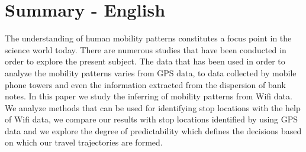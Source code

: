 \chapter{Summary - English}

The understanding of human mobility patterns constitutes a focus point in the
science world today. There are numerous studies that have been conducted in
order to explore the present subject. The data that has been used in order to
analyze the mobility patterns varies from GPS data, to data collected by mobile
phone towers and even the information extracted from the dispersion of bank
notes. In this paper we study the inferring of mobility patterns from Wifi data.
We analyze methods that can be used for identifying stop locations with the help
of Wifi data, we compare our results with stop locations identified by using GPS
data and we explore the degree of predictability which defines the decisions
based on which our travel trajectories are formed.